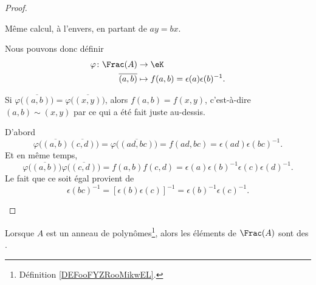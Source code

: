\begin{proof}
\begin{subproof}
\begin{subproof}
			\spitem[\( \Leftarrow\)]
			Même calcul, à l'envers, en partant de \( ay=bx\).
		\end{subproof}
		Nous pouvons donc définir
		\begin{equation}
			\begin{aligned}
				\varphi\colon \Frac(A) & \to \eK                                     \\
				\overline{(a,b)}       & \mapsto f(a,b)=\epsilon(a)\epsilon(b)^{-1}.
			\end{aligned}
		\end{equation}

		\begin{subproof}
			Si \( \varphi\big( \overline{(a,b)} \big)=\varphi\big( \overline{(x,y)} \big)\), alors \( f(a,b)=f(x,y)\), c'est-à-dire \( (a,b)\sim(x,y)\) par ce qui a été fait juste au-dessis.

			D'abord
			\begin{equation}
				\varphi\big( \overline{(a,b)}\overline{(c,d)} \big)=\varphi\big( \overline{(ad,bc)} \big)=f(ad,bc)=\epsilon(ad)\epsilon(bc)^{-1}.
			\end{equation}
			Et en même temps,
			\begin{equation}
				\varphi\big( \overline{(a,b)} \big)\varphi\big( \overline{(c,d)} \big)=f(a,b)f(c,d)=\epsilon(a)\epsilon(b)^{-1}\epsilon(c)\epsilon(d)^{-1}.
			\end{equation}
			Le fait que ce soit égal provient de
			\begin{equation}
				\epsilon(bc)^{-1}=[\epsilon(b)\epsilon(c)]^{-1}=\epsilon(b)^{-1}\epsilon(c)^{-1}.
			\end{equation}
		\end{subproof}
	\end{subproof}
\end{proof}


\begin{definition}	\label{DEFooXHKGooCcJbTR}
	Lorsque \( A\) est un anneau de polynômes\footnote{Définition \ref{DEFooFYZRooMikwEL}.}, alors les éléments de \( \Frac(A)\) sont des .
\end{definition}



